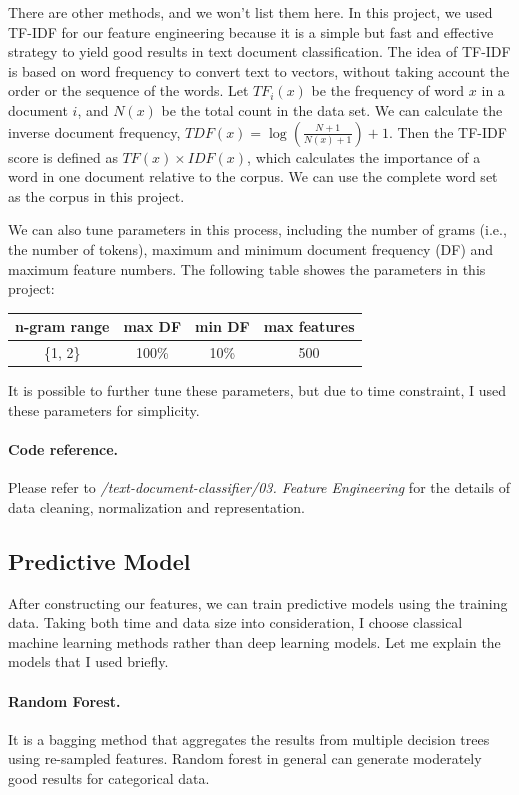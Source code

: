 \documentclass[11pt]{article}
\theoremstyle{remark}
\begin{document}
There are other methods, and we won't list them here. In this project, we used TF-IDF for our feature engineering because it is a simple but fast and effective strategy to yield good results in text document classification. 
The idea of TF-IDF  is based on word frequency to convert text to vectors, without taking account the order or the sequence of the words.  Let $TF_i(x)$ be the frequency of word $x$ in a document $i$, and $N(x)$ be the total count in the data set.  We can calculate the inverse document frequency, $TDF(x) = \log\left(\frac {N + 1} {N(x) + 1}\right) + 1$. Then the TF-IDF score is defined as $TF(x) \times IDF(x)$, which calculates the importance of a word in one document relative to the corpus. We can use the complete word set as the corpus in this project.

We can also tune parameters in this process, including the number of grams (i.e., the number of tokens), maximum and minimum document frequency (DF) and maximum feature numbers. The following table showes the parameters in this project:
\begin{center}
\begin{tabular}{ |c|c|c|c| } 
 \hline
n-gram range & max DF & min DF & max features \\
\hline
\{1, 2\} & 100\%  & 10\% & 500 \\
 \hline
\end{tabular}
\end{center}

It is possible to further tune these parameters, but due to time constraint, I used these parameters for simplicity. 

\paragraph{Code reference.}
Please refer to {\em /text-document-classifier/03. Feature Engineering} for the details of data cleaning, normalization and representation.

\subsection{Predictive Model}
After constructing our features, we can train predictive models using the training data. Taking both time and data size into consideration, I choose classical machine learning methods rather than deep learning models. Let me explain the models that I used briefly.

\paragraph{Random Forest.} 
It is a bagging method that aggregates the results from multiple decision trees using re-sampled features. Random forest in general can generate moderately good results for categorical data. 
\end{document}
